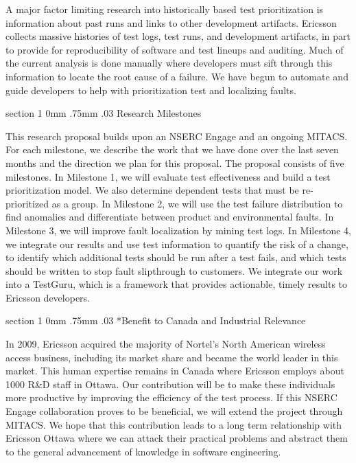 \documentclass[12pt, letterpaper]{article}
\makeatletter
\renewcommand{\section}{\@startsection
{section}%
{1}%
{0mm}%
{.75mm}
{.03\baselineskip}%
{\normalfont\large\bf} %
}
\makeatother
\begin{document}
A major factor limiting research into historically based test prioritization is
information about past runs and links to other development artifacts.  Ericsson
collects massive histories of test logs, test runs, and development artifacts, in
part to provide for reproducibility of software and test lineups and auditing.
Much of the current analysis is done manually where developers must sift
through this information to locate the root cause of a failure. We have begun
to automate and guide developers to help with prioritization test and
localizing faults.



\section{Research Milestones} 

This research proposal builds upon an NSERC Engage and an ongoing MITACS. For
each milestone, we describe the work that we have done over the last seven months
and the direction we plan for this proposal. The proposal consists of five 
milestones. In Milestone 1, we will evaluate test effectiveness and build a
test prioritization model. We also determine dependent tests that must be re-prioritized as a group. In Milestone 2, we will use the test failure
distribution to find anomalies and differentiate between product and
environmental faults. In Milestone 3, we will improve fault localization by
mining test logs. In Milestone 4, we integrate our results and use test
information to quantify the risk of a change, to identify which additional
tests should be run after a test fails, and which tests should be written to
stop fault slipthrough to customers.  We integrate our work into a TestGuru, which is a framework
that provides actionable, timely results to Ericsson developers.













\section*{Benefit to Canada and Industrial Relevance}

In 2009, Ericsson acquired the majority of Nortel's North American wireless
access business, including its market share and became the world leader in this
market. This human expertise remains in Canada where Ericsson employs about
1000 R\&D staff in Ottawa. Our contribution will be to make these individuals
more productive by improving the efficiency of the test process. If this NSERC
Engage collaboration proves to be beneficial, we will extend the project
through MITACS. We hope that this contribution leads to a long term
relationship with Ericsson Ottawa where we can attack their practical problems
and abstract them to the general advancement of knowledge in software
engineering.


\pagebreak


\end{document}
